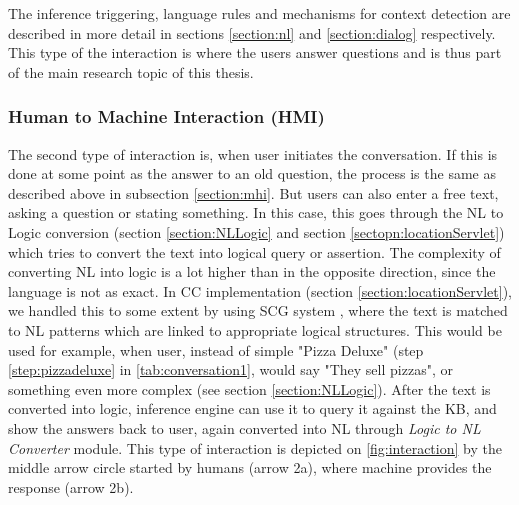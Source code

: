 The inference triggering, language rules and mechanisms for context detection
are described in more detail in sections \ref{section:nl} and 
\ref{section:dialog} respectively. This
type of the interaction is where the users answer questions and is thus part of
the main research topic of this thesis.

\subsubsection{Human to Machine Interaction (HMI)}
\label{section:hmi}
The second type of interaction is, when user initiates the conversation. 
If this is done at some point as the answer to an old question, the process is 
the same as described above in subsection \ref{section:mhi}. But users can 
also enter a 
free text, asking a question or stating something. In this case, this goes 
through the NL to Logic conversion (section \ref{section:NLLogic} and section 
\ref{sectopn:locationServlet}) which tries to convert the
text into logical query or assertion. The complexity of converting NL into logic 
is a lot higher than in the opposite direction, since the language is not
as exact. In CC implementation (section \ref{section:locationServlet}), we 
handled this to
some extent by using SCG system \parencite{Schneider2015}, where the text
is matched to NL patterns which are linked to appropriate logical structures.
This would be used for example, when user, instead of simple "Pizza Deluxe" 
(step \ref{step:pizzadeluxe} in \autoref{tab:conversation1}, would say 
"They sell pizzas", or something even more complex (see section 
\ref{section:NLLogic}). After the text is converted into logic, inference engine 
can use it to query it against the KB, and show the answers back to user, again 
converted into NL through \emph{Logic to NL Converter} module. This type of
interaction is depicted on \autoref{fig:interaction} by the middle arrow circle
started by humans (arrow 2a), where machine provides the response (arrow 2b).

